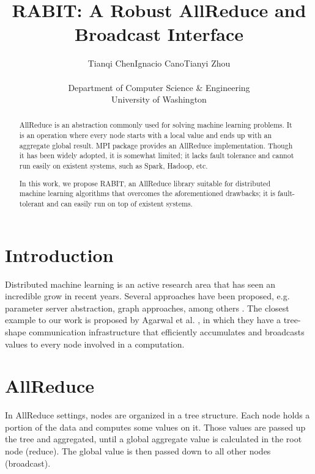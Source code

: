 \documentclass[10pt,twocolumn]{article}
\begin{document}
\title{\bf RABIT: A Robust AllReduce and Broadcast Interface}
\author{Tianqi Chen\hspace{0.5in}Ignacio Cano\hspace{0.5in}Tianyi Zhou \\\\
Department of Computer Science \& Engineering \\
University of Washington\\
}
\date{}
\maketitle
\thispagestyle{empty}

\begin{abstract}

AllReduce is an abstraction commonly used for solving machine learning problems. It is an operation where every node starts with a local value and ends up with an aggregate global result.
MPI package provides an AllReduce implementation. Though it has been widely adopted, it is somewhat limited; it lacks fault tolerance and cannot run easily on existent systems, such as Spark, Hadoop, etc.

In this work, we propose RABIT, an AllReduce library suitable for distributed machine learning algorithms that overcomes the aforementioned drawbacks; it is fault-tolerant and can easily run on top of existent systems.

\end{abstract}

\section{Introduction}
Distributed machine learning is an active research area that has seen an incredible grow in recent years. Several approaches have been proposed, e.g. parameter server abstraction, graph approaches, among others \cite{paramServer,DuchiAW12,Zinkevich,Dekel,Low}. The closest example to our work is proposed by Agarwal et al. \cite{Agarwal}, in which they have a tree-shape communication infrastructure that efficiently accumulates and broadcasts values to every node involved in a computation.



\section{AllReduce}

In AllReduce settings, nodes are organized in a tree structure. Each node holds a portion of the data and computes some values on it. Those values are passed up the tree and aggregated, until a global aggregate value is calculated in the root node (reduce). The global value is then passed down to all other nodes (broadcast). 
\end{document}
